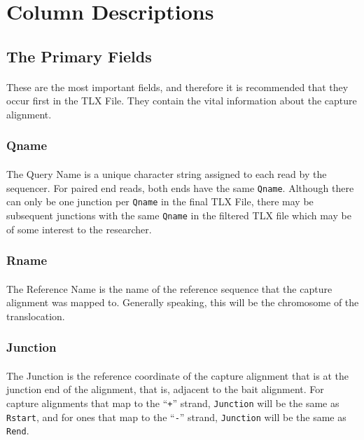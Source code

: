 \documentclass{article}
\begin{document}
\section{Column Descriptions}
\subsection{The Primary Fields}
\paragraph{} These are the most important fields, and therefore it is recommended that they occur first in the TLX File. They contain the vital information about the capture alignment.
\subsubsection*{Qname}
\paragraph{} The Query Name is a unique character string assigned to each read by the sequencer. For paired end reads, both ends have the same \texttt{Qname}. Although there can only be one junction per \texttt{Qname} in the final TLX File, there may be subsequent junctions with the same \texttt{Qname} in the filtered TLX file which may be of some interest to the researcher. 
\subsubsection*{Rname}
\paragraph{} The Reference Name is the name of the reference sequence that the capture alignment was mapped to. Generally speaking, this will be the chromosome of the translocation.
\subsubsection*{Junction}
\paragraph{} The Junction is the reference coordinate of the capture alignment that is at the junction end of the alignment, that is, adjacent to the bait alignment. For capture alignments that map to the ``\texttt{+}'' strand, \texttt{Junction} will be the same as \texttt{Rstart}, and for ones that map to the ``\texttt{-}'' strand, \texttt{Junction} will be the same as \texttt{Rend}.
\end{document}
